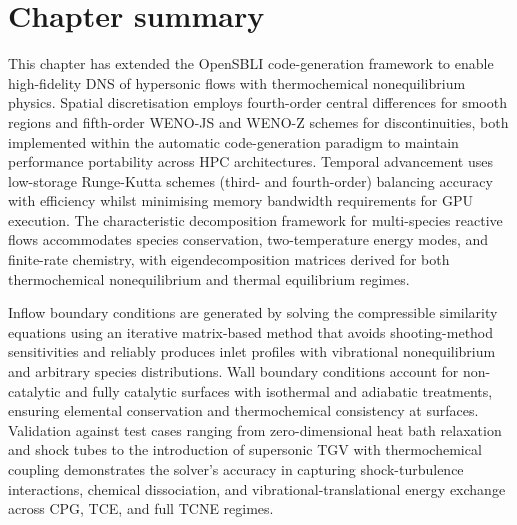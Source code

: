 \newpage


\section*{Chapter summary}

This chapter has extended the OpenSBLI code-generation framework to enable high-fidelity \gls{DNS} of hypersonic flows with thermochemical nonequilibrium physics. Spatial discretisation employs fourth-order central differences for smooth regions and fifth-order WENO-JS and WENO-Z schemes for discontinuities, both implemented within the automatic code-generation paradigm to maintain performance portability across HPC architectures. Temporal advancement uses low-storage Runge-Kutta schemes (third- and fourth-order) balancing accuracy with efficiency whilst minimising memory bandwidth requirements for GPU execution. The characteristic decomposition framework for multi-species reactive flows accommodates species conservation, two-temperature energy modes, and finite-rate chemistry, with eigendecomposition matrices derived for both thermochemical nonequilibrium and thermal equilibrium regimes.

Inflow boundary conditions are generated by solving the compressible similarity equations using an iterative matrix-based method that avoids shooting-method sensitivities and reliably produces inlet profiles with vibrational nonequilibrium and arbitrary species distributions. Wall boundary conditions account for non-catalytic and fully catalytic surfaces with isothermal and adiabatic treatments, ensuring elemental conservation and thermochemical consistency at surfaces. Validation against test cases ranging from zero-dimensional heat bath relaxation and shock tubes to the introduction of supersonic \gls{TGV} with thermochemical coupling demonstrates the solver's accuracy in capturing shock-turbulence interactions, chemical dissociation, and vibrational-translational energy exchange across \gls{CPG}, \gls{TCE}, and full \gls{TCNE} regimes.



